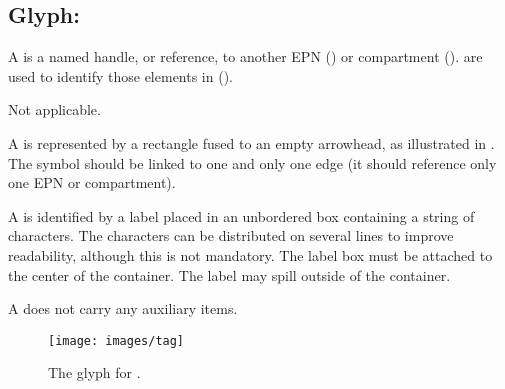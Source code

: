 
\subsection{Glyph: }
\label{sec:tag}

A  is a named handle, or reference, to another EPN () or compartment ().   are used to identify those elements in  ().

\begin{glyphDescription}

\glyphSboTerm Not applicable.

\glyphContainer A  is represented by a rectangle fused to an empty arrowhead, as illustrated in .  The symbol should be linked to one and only one edge (\ie it should reference only one EPN or compartment).

\glyphLabel A  is identified by a label placed in an unbordered box containing a string of characters.  The characters can be distributed on several lines to improve readability, although this is not mandatory.  The label box must be attached to the center of the container. The label may spill outside of the container.

\glyphAux A  does not carry any auxiliary items. 

\end{glyphDescription}

\begin{figure}[H]
  \centering
  \texttt{[image: images/tag]}
  \caption{The \PD glyph for .}
  \label{fig:tag}
\end{figure}






